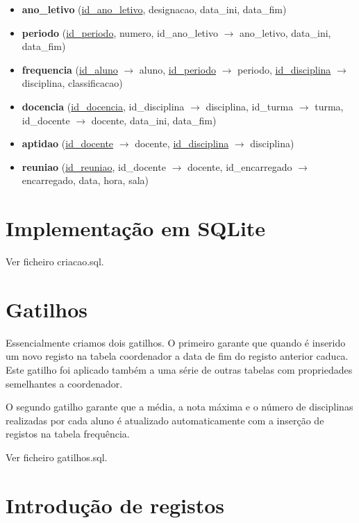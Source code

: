 \documentclass[12pt,a4paper,reqno]{report}
\numberwithin{figure}{section}
\numberwithin{equation}{section}
\begin{document}
\begin{itemize}
\item \textbf{ano\_letivo} (\underline{id\_ano\_letivo}, designacao, data\_ini, data\_fim)

\item \textbf{periodo} (\underline{id\_periodo}, numero, id\_ano\_letivo $\rightarrow$ ano\_letivo, data\_ini, data\_fim)

\item \textbf{frequencia} (\underline{id\_aluno} $\rightarrow$ aluno, \underline{id\_periodo} $\rightarrow$ periodo, \underline{id\_disciplina} $\rightarrow$ disciplina, classificacao)

\item \textbf{docencia} (\underline{id\_docencia}, id\_disciplina $\rightarrow$ disciplina, id\_turma $\rightarrow$ turma, id\_docente $\rightarrow$ docente, data\_ini, data\_fim)

\item \textbf{aptidao} (\underline{id\_docente} $\rightarrow$ docente, \underline{id\_disciplina} $\rightarrow$ disciplina)

\item \textbf{reuniao} (\underline{id\_reuniao}, id\_docente $\rightarrow$ docente, id\_encarregado $\rightarrow$ encarregado, data, hora, sala)

\end{itemize}

\chapter{Implementação em SQLite}

Ver ficheiro criacao.sql.

\chapter{Gatilhos}

Essencialmente criamos dois gatilhos. O primeiro garante que quando é inserido um novo registo na tabela coordenador a data de fim do registo anterior caduca. Este gatilho foi aplicado também a uma série de outras tabelas com propriedades semelhantes a coordenador.

O segundo gatilho garante que a média, a nota máxima e o número de disciplinas realizadas por cada aluno é atualizado automaticamente com a inserção de registos na tabela frequência.

Ver ficheiro gatilhos.sql.

\chapter{Introdução de registos}
\end{document}
